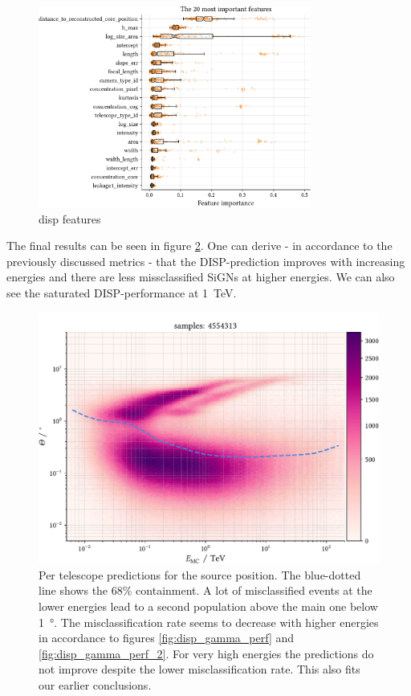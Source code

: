 \begin{figure}
	\centering
	\includegraphics[width=0.8\textwidth]{../analysis/plots/disp_features.pdf}
	\caption{disp features}
	\label{fig:disp_features}
\end{figure}

The final results can be seen in figure \ref{fig:sens_telescope}.
One can derive - in accordance to the previously discussed metrics - 
that the DISP-prediction improves with increasing energies and there are less
missclassified SiGNs at higher energies.
We can also see the saturated DISP-performance at \SI{1}{\tera\electronvolt}.

\begin{figure}
    \centering
    \includegraphics[width=.8\textwidth]{../analysis/plots/gamma/tel_vs_energy.pdf}
    \caption{Per telescope predictions for the source position. The blue-dotted line 
    shows the 68\% containment. A lot of misclassified events at the lower energies
    lead to a second population above the main one below \SI{1}{\degree}.
    The misclassification rate seems to decrease with higher energies 
    in accordance to figures \ref{fig:disp_gamma_perf} and \ref{fig:disp_gamma_perf_2}.
    For very high energies the predictions do not improve despite the lower 
    misclassification rate. This also fits our earlier conclusions.}
    \label{fig:sens_telescope}
\end{figure}



